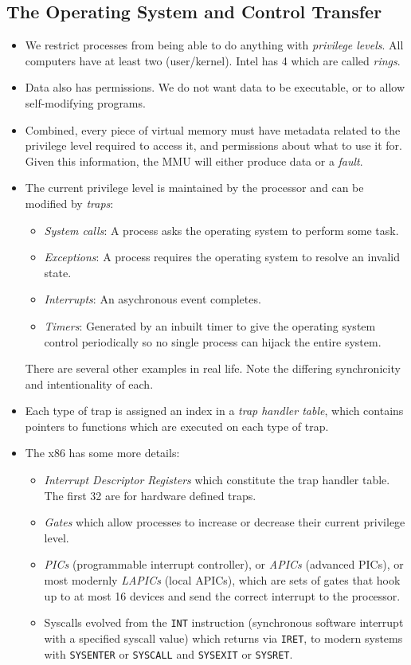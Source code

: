 \documentclass[12pt]{article}
\begin{document}
\subsection{The Operating System and Control Transfer}
\begin{itemize}
	\item We restrict processes from being able to do anything with \textit{privilege levels}. All computers have at least two (user/kernel). Intel has 4 which are called \textit{rings}. 
	\item Data also has permissions. We do not want data to be executable, or to allow self-modifying programs. 
	\item Combined, every piece of virtual memory must have metadata related to the privilege level required to access it, and permissions about what to use it for. Given this information, the MMU will either produce data or a \textit{fault}. 
	\item The current privilege level is maintained by the processor and can be modified by \textit{traps}:
		\begin{itemize}
			\item \textit{System calls}: A process asks the operating system to perform some task.
			\item \textit{Exceptions}: A process requires the operating system to resolve an invalid state.
			\item \textit{Interrupts}: An asychronous event completes.
			\item \textit{Timers}: Generated by an inbuilt timer to give the operating system control periodically so no single process can hijack the entire system. 
		\end{itemize}
		There are several other examples in real life. Note the differing synchronicity and intentionality of each.
		\newpage
	\item Each type of trap is assigned an index in a \textit{trap handler table}, which contains pointers to functions which are executed on each type of trap. 
	\item The x86 has some more details:
		\begin{itemize}
			\item \textit{Interrupt Descriptor Registers} which constitute the trap handler table. The first 32 are for hardware defined traps. 
			\item \textit{Gates} which allow processes to increase or decrease their current privilege level.
			\item \textit{PICs} (programmable interrupt controller), or \textit{APICs} (advanced PICs), or most modernly \textit{LAPICs} (local APICs), which are sets of gates that hook up to at most 16 devices and send the correct interrupt to the processor. 
			\item Syscalls evolved from the \texttt{INT} instruction (synchronous software interrupt with a specified syscall value) which returns via \texttt{IRET}, to modern systems with \texttt{SYSENTER} or \texttt{SYSCALL} and \texttt{SYSEXIT} or \texttt{SYSRET}. 
		\end{itemize}
\end{itemize}
\end{document}
